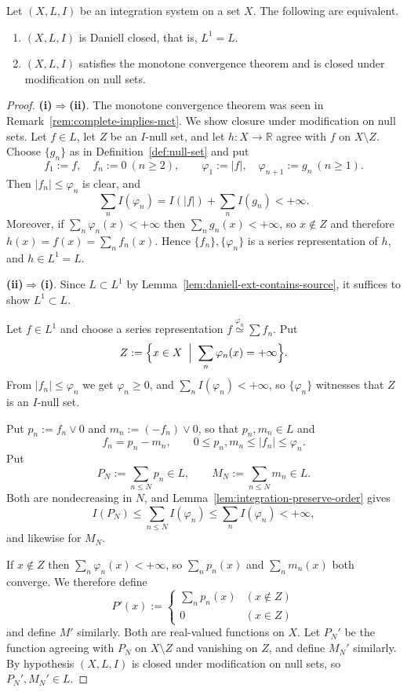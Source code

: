\begin{theorem}\label{thm:complete-intrinsic}
  Let $(X,L,I)$ be an integration system on a set $X$. The following are
  equivalent.
  \begin{enumerate}
    \item[(i)] $(X,L,I)$ is Daniell closed, that is, $L^1=L$.
    \item[(ii)] $(X,L,I)$ satisfies the monotone convergence theorem and is
      closed under modification on null sets.
  \end{enumerate}
\end{theorem}
\begin{proof}
  \textbf{(i)$\Rightarrow$(ii)}.
  The monotone convergence theorem was seen in
  Remark~\ref{rem:complete-implies-mct}.
  We show closure under modification on null sets.
  Let $f\in L$, let $Z$ be an $I$-null set, and let $h:X\to\mathbb{R}$ agree with
  $f$ on $X\setminus Z$.
  Choose $\{g_n\}$ as in Definition~\ref{def:null-set} and put
  \[
    f_1:=f,\quad f_n:=0\ (n\ge2),
    \qquad
    \varphi_1:=|f|,\quad \varphi_{n+1}:=g_n\ (n\ge1) .
  \]
  Then $|f_n|\le\varphi_n$ is clear, and
  \[
    \sum_{n}I(\varphi_n)=I(|f|)+\sum_nI(g_n)<+\infty .
  \]
  Moreover, if $\sum_n\varphi_n(x)<+\infty$ then $\sum_ng_n(x)<+\infty$, so
  $x\notin Z$ and therefore $h(x)=f(x)=\sum_nf_n(x)$.
  Hence $\{f_n\},\{\varphi_n\}$ is a series representation of $h$, and
  $h\in L^1=L$.

  \textbf{(ii)$\Rightarrow$(i)}.
  Since $L\subset L^1$ by
  Lemma~\ref{lem:daniell-ext-contains-source}, it suffices to show
  $L^1\subset L$.

  Let $f\in L^1$ and choose a series representation
  $f\overset{\varphi_n}{\simeq}\sum f_n$.
  Put
  \[
    Z:=\Bigl\{x\in X\;\Bigm|\;\sum_n\varphi_n(x)=+\infty\Bigr\} .
  \]
  From $|f_n|\le\varphi_n$ we get $\varphi_n\ge0$, and
  $\sum_nI(\varphi_n)<+\infty$, so $\{\varphi_n\}$ witnesses that $Z$ is an
  $I$-null set.

  Put $p_n:=f_n\lor0$ and $m_n:=(-f_n)\lor0$, so that $p_n,m_n\in L$ and
  \[
    f_n=p_n-m_n,
    \qquad
    0\le p_n,m_n\le|f_n|\le\varphi_n .
  \]
  Put
  \[
    P_N:=\sum_{n\le N}p_n\in L,
    \qquad
    M_N:=\sum_{n\le N}m_n\in L .
  \]
  Both are nondecreasing in $N$, and
  Lemma~\ref{lem:integration-preserve-order} gives
  \[
    I(P_N)\le\sum_{n\le N}I(\varphi_n)\le\sum_nI(\varphi_n)<+\infty ,
  \]
  and likewise for $M_N$.

  If $x\notin Z$ then $\sum_n\varphi_n(x)<+\infty$, so $\sum_np_n(x)$ and
  $\sum_nm_n(x)$ both converge. We therefore define
  \[
    P'(x):=
    \begin{cases}
      \sum_np_n(x) & (x\notin Z)\\
      0 & (x\in Z)
    \end{cases}
  \]
  and define $M'$ similarly. Both are real-valued functions on $X$.
  Let $P_N'$ be the function agreeing with $P_N$ on $X\setminus Z$ and vanishing
  on $Z$, and define $M_N'$ similarly.
  By hypothesis $(X,L,I)$ is closed under modification on null sets, so
  $P_N',M_N'\in L$.


\end{proof}
